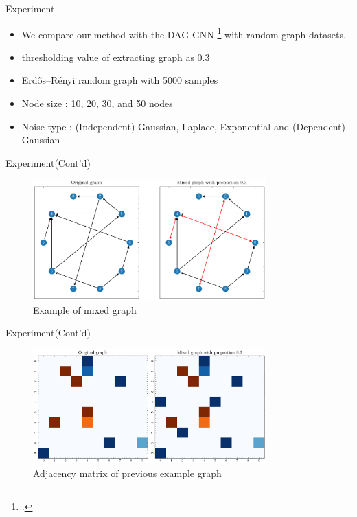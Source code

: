 \documentclass{beamer}
\begin{document}
\begin{frame}{Experiment}
    \begin{itemize}
        \item We compare our method with the DAG-GNN \footcite{yu2019daggnn} with random graph datasets.
        \item thresholding value of extracting graph as 0.3
        \item Erdős–Rényi random graph with 5000 samples
        \item Node size : 10, 20, 30, and 50 nodes
        \item Noise type : (Independent) Gaussian, Laplace, Exponential and (Dependent) Gaussian
    \end{itemize}
\end{frame}

\begin{frame}{Experiment(Cont'd)}
    \begin{figure}
        \centering
        \includegraphics[width=0.8\textwidth]{fig/mixed_graph_example.png}
        \caption{Example of mixed graph}
        \label{fig:mixed_graph_example}
    \end{figure}
\end{frame}

\begin{frame}{Experiment(Cont'd)}
    \begin{figure}
        \centering
        \includegraphics[width=0.8\textwidth]{fig/mixed_graph_adjacency.png}
        \caption{Adjacency matrix of previous example graph}
        \label{fig:mixed_graph_adjacency}
    \end{figure}
\end{frame}
\end{document}
